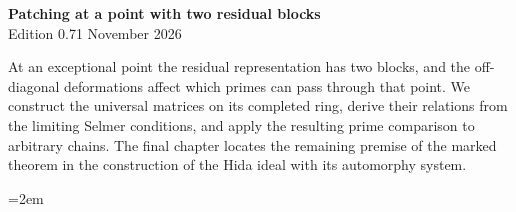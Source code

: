 \begin{center}
{\Large\bfseries Patching at a point with two residual blocks}\\[4pt]
Edition 0.71  November 2026
\end{center}

At an exceptional point the residual representation has two blocks,
and the off-diagonal deformations affect which primes can pass through
that point. We construct the universal matrices on its completed ring,
derive their relations from the limiting Selmer conditions, and apply
the resulting prime comparison to arbitrary chains. The final chapter
locates the remaining premise of the marked theorem in the construction
of the Hida ideal with its automorphy system.

\begingroup\emergencystretch=2em\providecommand{\Sha}{\mathop{\mathrm{Sha}}}






\endgroup
